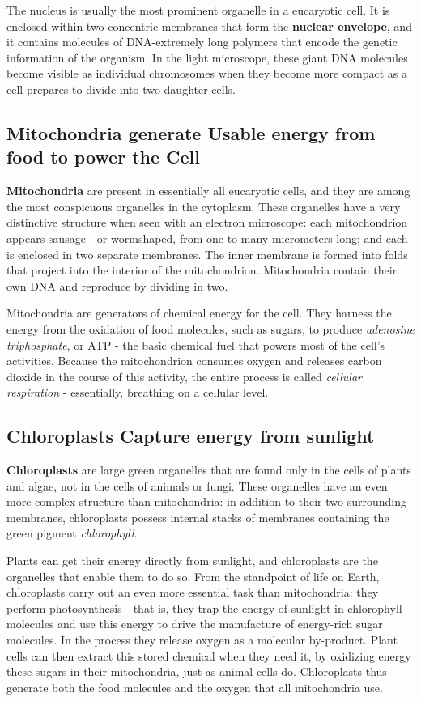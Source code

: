 The nucleus is usually the most prominent organelle in a eucaryotic cell.
It is enclosed within two concentric membranes that form
the \textbf{nuclear envelope}, and it contains molecules of DNA-extremely long
polymers that encode the genetic information of the organism. In the
light microscope, these giant DNA molecules become visible as individual
chromosomes when they become more compact as a cell prepares to
divide into two daughter cells.

\subsection{Mitochondria generate Usable energy from food to power the Cell}

\textbf{Mitochondria} are present in essentially all eucaryotic cells, and they are
among the most conspicuous organelles in the cytoplasm.
These organelles have a very distinctive structure when seen with an
electron microscope: each mitochondrion appears sausage - or wormshaped,
from one to many micrometers long; and each is enclosed in
two separate membranes. The inner membrane is formed into folds that
project into the interior of the mitochondrion. Mitochondria
contain their own DNA and reproduce by dividing in two.

Mitochondria are generators of
chemical energy for the cell. They harness the energy from the oxidation
of food molecules, such as sugars, to produce \textit{adenosine triphosphate},
or ATP - the basic chemical fuel that powers most of the cell’s activities.
Because the mitochondrion consumes oxygen and releases carbon
dioxide in the course of this activity, the entire process is called \textit{cellular
respiration} - essentially, breathing on a cellular level.

\subsection{Chloroplasts Capture energy from sunlight}

\textbf{Chloroplasts} are large green organelles that are found only in the cells
of plants and algae, not in the cells of animals or fungi. These organelles
have an even more complex structure than mitochondria: in addition to
their two surrounding membranes, chloroplasts possess internal stacks
of membranes containing the green pigment \textit{chlorophyll}.

Plants can get their energy directly from sunlight, and chloroplasts are
the organelles that enable them to do so.
From the standpoint of life on Earth, chloroplasts carry out an even more
essential task than mitochondria: they perform photosynthesis - that is,
they trap the energy of sunlight in chlorophyll molecules and use this
energy to drive the manufacture of energy-rich sugar molecules. In the
process they release oxygen as a molecular by-product. Plant cells can
then extract this stored chemical when they need it, by oxidizing
energy these sugars in their mitochondria, just as animal cells do.
Chloroplasts thus generate both the food molecules and the oxygen that all
mitochondria use.

